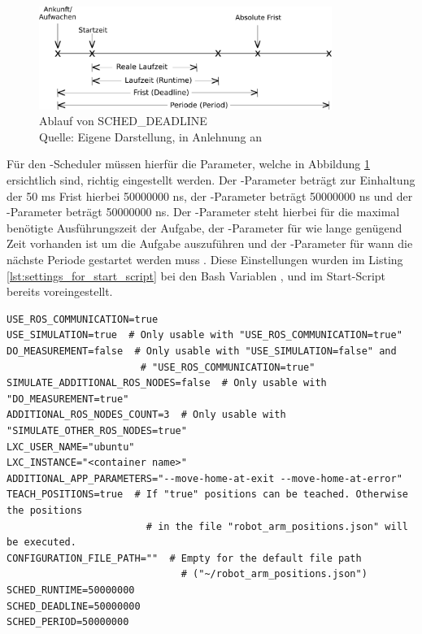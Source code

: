 \begin{figure}[htb]
	\centering
	\includegraphics[width=0.85\textwidth]{images/anhang/sched_deadline}
	\caption[Ablauf von SCHED\_DEADLINE]{Ablauf von SCHED\_DEADLINE\\Quelle: Eigene Darstellung, in Anlehnung an \cite{man_sched7_nodate}}
	\label{fig:sched_deadline}
\end{figure}
\FloatBarrier

Für den -Scheduler müssen hierfür die Parameter, welche in Abbildung \ref{fig:sched_deadline} ersichtlich sind, richtig eingestellt werden. Der -Parameter beträgt zur Einhaltung der 50 ms Frist hierbei 50000000 ns, der -Parameter beträgt 50000000 ns und der -Parameter beträgt 50000000 ns. Der -Parameter steht hierbei für die maximal benötigte Ausführungszeit der Aufgabe, der -Parameter für wie lange genügend Zeit vorhanden ist um die Aufgabe auszuführen und der -Parameter für wann die nächste Periode gestartet werden muss \cite{man_sched7_nodate}. Diese Einstellungen wurden im Listing \ref{lst:settings_for_start_script} bei den Bash Variablen ,  und  im Start-Script bereits voreingestellt.\\

\begin{lstlisting}[style=bash, caption={Einstellungen des Start-Scripts der Roboter-Gesten-Anwendung}, label={lst:settings_for_start_script}]
USE_ROS_COMMUNICATION=true
USE_SIMULATION=true  # Only usable with "USE_ROS_COMMUNICATION=true"
DO_MEASUREMENT=false  # Only usable with "USE_SIMULATION=false" and
                       # "USE_ROS_COMMUNICATION=true"
SIMULATE_ADDITIONAL_ROS_NODES=false  # Only usable with "DO_MEASUREMENT=true"
ADDITIONAL_ROS_NODES_COUNT=3  # Only usable with "SIMULATE_OTHER_ROS_NODES=true"
LXC_USER_NAME="ubuntu"
LXC_INSTANCE="<container name>"
ADDITIONAL_APP_PARAMETERS="--move-home-at-exit --move-home-at-error"
TEACH_POSITIONS=true  # If "true" positions can be teached. Otherwise the positions
                        # in the file "robot_arm_positions.json" will be executed.
CONFIGURATION_FILE_PATH=""  # Empty for the default file path
                              # ("~/robot_arm_positions.json")
SCHED_RUNTIME=50000000
SCHED_DEADLINE=50000000
SCHED_PERIOD=50000000
\end{lstlisting}\leavevmode\newline\vspace{-1.0em}

